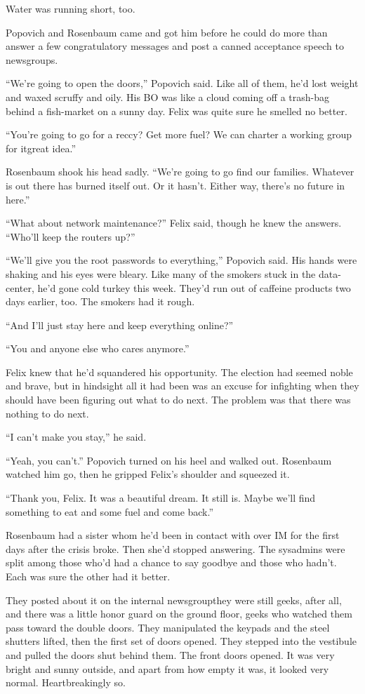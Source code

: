 Water was running short, too.

Popovich and Rosenbaum came and got him before he could do more
than answer a few congratulatory messages and post a canned
acceptance speech to newsgroups.

“We’re going to open the doors,” Popovich said. Like all of them,
he’d lost weight and waxed scruffy and oily. His BO was like a
cloud coming off a trash-bag behind a fish-market on a sunny day.
Felix was quite sure he smelled no better.

“You’re going to go for a reccy? Get more fuel? We can charter a
working group for it\dash{}great idea.”

Rosenbaum shook his head sadly. “We’re going to go find our
families. Whatever is out there has burned itself out. Or it
hasn’t. Either way, there’s no future in here.”

“What about network maintenance?” Felix said, though he knew the
answers. “Who’ll keep the routers up?”

“We’ll give you the root passwords to everything,” Popovich said.
His hands were shaking and his eyes were bleary. Like many of the
smokers stuck in the data-center, he’d gone cold turkey this week.
They’d run out of caffeine products two days earlier, too. The
smokers had it rough.

“And I’ll just stay here and keep everything online?”

“You and anyone else who cares anymore.”

Felix knew that he’d squandered his opportunity. The election had
seemed noble and brave, but in hindsight all it had been was an
excuse for infighting when they should have been figuring out what
to do next. The problem was that there was nothing to do next.

“I can’t make you stay,” he said.

“Yeah, you can’t.” Popovich turned on his heel and walked out.
Rosenbaum watched him go, then he gripped Felix’s shoulder and
squeezed it.

“Thank you, Felix. It was a beautiful dream. It still is. Maybe
we’ll find something to eat and some fuel and come back.”

Rosenbaum had a sister whom he’d been in contact with over IM for
the first days after the crisis broke. Then she’d stopped
answering. The sysadmins were split among those who’d had a chance
to say goodbye and those who hadn’t. Each was sure the other had it
better.

They posted about it on the internal newsgroup\dash{}they were still
geeks, after all, and there was a little honor guard on the ground
floor, geeks who watched them pass toward the double doors. They
manipulated the keypads and the steel shutters lifted, then the
first set of doors opened. They stepped into the vestibule and
pulled the doors shut behind them. The front doors opened. It was
very bright and sunny outside, and apart from how empty it was, it
looked very normal. Heartbreakingly so.

